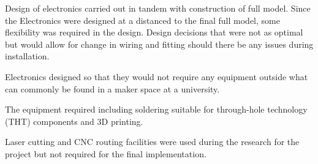 




Design of electronics carried out in tandem with construction of full
model. Since the Electronics were designed at a distanced to the final
full model, some flexibility was required in the design. Design decisions
that were not as optimal but would allow for change in wiring and
fitting should there be any issues during installation.

Electronics designed so that they would not require any equipment
outside what can commonly be found in a maker space at a university.

The equipment required including soldering suitable for through-hole
technology (THT) components and 3D printing.

Laser cutting and CNC routing facilities were used during the research
for the project but not required for the final implementation.


